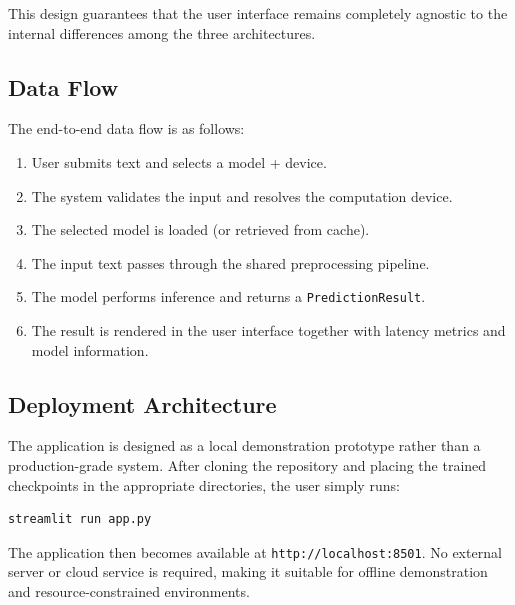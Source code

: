 \documentclass[12pt]{report} %
\begin{document}
This design guarantees that the user interface remains completely agnostic to the internal differences among the three architectures.

\subsection{Data Flow}

The end-to-end data flow is as follows:
\begin{enumerate}
    \item User submits text and selects a model + device.
    \item The system validates the input and resolves the computation device.
    \item The selected model is loaded (or retrieved from cache).
    \item The input text passes through the shared preprocessing pipeline.
    \item The model performs inference and returns a \texttt{PredictionResult}.
    \item The result is rendered in the user interface together with latency metrics and model information.
\end{enumerate}

\subsection{Deployment Architecture}
\label{subsec:deployment-architecture}

The application is designed as a local demonstration prototype rather than a production-grade system. After cloning the repository and placing the trained checkpoints in the appropriate directories, the user simply runs:
\begin{verbatim}
streamlit run app.py
\end{verbatim}
The application then becomes available at \texttt{http://localhost:8501}. No external server or cloud service is required, making it suitable for offline demonstration and resource-constrained environments.
\end{document}
